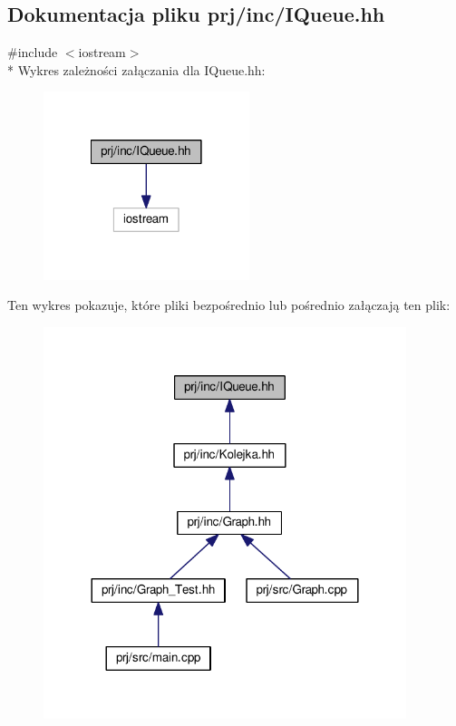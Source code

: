 \hypertarget{_i_queue_8hh}{\subsection{Dokumentacja pliku prj/inc/\-I\-Queue.hh}
\label{_i_queue_8hh}
}
{\ttfamily \#include $<$iostream$>$}\\*
Wykres zależności załączania dla I\-Queue.\-hh\-:
\nopagebreak
\begin{figure}[H]
\begin{center}
\leavevmode
\includegraphics[width=170pt]{_i_queue_8hh__incl}
\end{center}
\end{figure}
Ten wykres pokazuje, które pliki bezpośrednio lub pośrednio załączają ten plik\-:
\nopagebreak
\begin{figure}[H]
\begin{center}
\leavevmode
\includegraphics[width=300pt]{_i_queue_8hh__dep__incl}
\end{center}
\end{figure}
